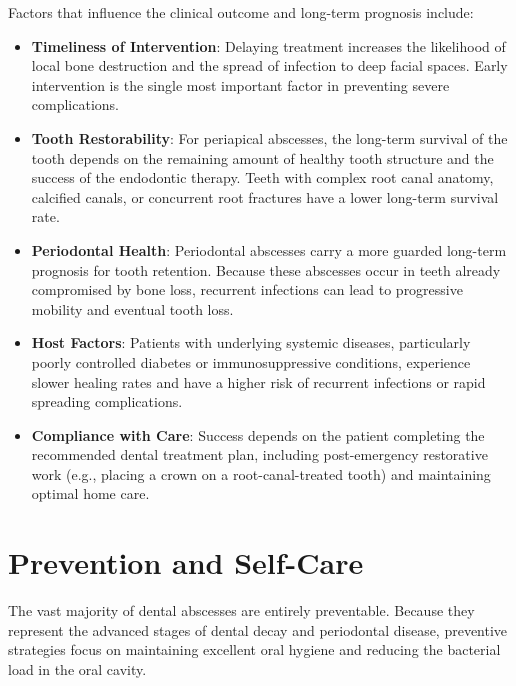 Factors that influence the clinical outcome and long-term prognosis include:
\begin{itemize}
  \item \textbf{Timeliness of Intervention}: Delaying treatment increases the likelihood of local bone destruction and the spread of infection to deep facial spaces. Early intervention is the single most important factor in preventing severe complications.
  \item \textbf{Tooth Restorability}: For periapical abscesses, the long-term survival of the tooth depends on the remaining amount of healthy tooth structure and the success of the endodontic therapy. Teeth with complex root canal anatomy, calcified canals, or concurrent root fractures have a lower long-term survival rate.
  \item \textbf{Periodontal Health}: Periodontal abscesses carry a more guarded long-term prognosis for tooth retention. Because these abscesses occur in teeth already compromised by bone loss, recurrent infections can lead to progressive mobility and eventual tooth loss.
  \item \textbf{Host Factors}: Patients with underlying systemic diseases, particularly poorly controlled diabetes or immunosuppressive conditions, experience slower healing rates and have a higher risk of recurrent infections or rapid spreading complications.
  \item \textbf{Compliance with Care}: Success depends on the patient completing the recommended dental treatment plan, including post-emergency restorative work (e.g., placing a crown on a root-canal-treated tooth) and maintaining optimal home care.
\end{itemize}

\section*{Prevention and Self-Care}
The vast majority of dental abscesses are entirely preventable. Because they represent the advanced stages of dental decay and periodontal disease, preventive strategies focus on maintaining excellent oral hygiene and reducing the bacterial load in the oral cavity.

